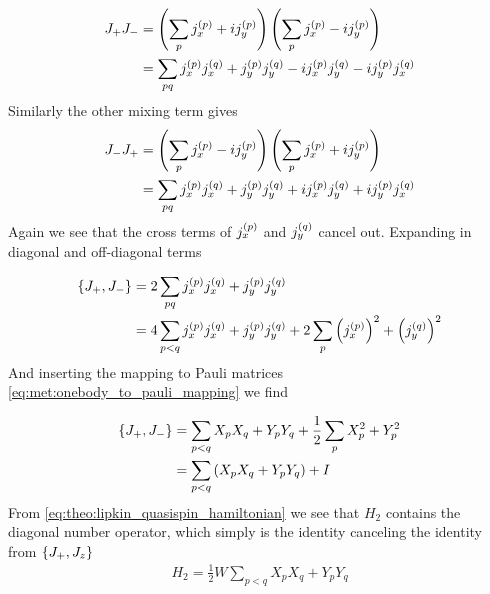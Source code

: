 \begin{align*}
    J_+ J_- &= \left(\sum_p j_{x}^{(p)} + ij_{y}^{(p)}\right) \left(\sum_p j_{x}^{(p)} - ij_{y}^{(p)}\right) \\
    &= \sum_{pq} j_{x}^{(p)}j_{x}^{(q)} + j_{y}^{(p)}j_{y}^{(q)} -i j_{x}^{(p)}j_{y}^{(q)} -i j_{y}^{(p)}j_{x}^{(q)}
\end{align*}
Similarly the other mixing term gives
\begin{align*}
    J_- J_+ &= \left(\sum_p j_{x}^{(p)} - ij_{y}^{(p)}\right) \left(\sum_p j_{x}^{(p)} + ij_{y}^{(p)}\right) \\
    &= \sum_{pq} j_{x}^{(p)}j_{x}^{(q)} + j_{y}^{(p)}j_{y}^{(q)} +i j_{x}^{(p)}j_{y}^{(q)} +i j_{y}^{(p)}j_{x}^{(q)}
\end{align*}
Again we see that the cross terms of $j_{x}^{(p)}$ and $j_{y}^{(q)}$ cancel out. Expanding in diagonal and off-diagonal terms

\begin{align*}
    \{J_+, J_-\} &= 2 \sum_{pq} j_{x}^{(p)}j_{x}^{(q)} + j_{y}^{(p)}j_{y}^{(q)} \\
    &= 4 \sum_{p < q} j_{x}^{(p)}j_{x}^{(q)} + j_{y}^{(p)}j_{y}^{(q)} + 2\sum_{p} \left(j_{x}^{(p)}\right)^2 + \left(j_{y}^{(q)}\right)^2
\end{align*}
And inserting the mapping to Pauli matrices \cref{eq:met:onebody_to_pauli_mapping} we find

\begin{align*}
    \{J_+, J_-\} &= \sum_{p < q} X_p X_q + Y_p Y_q + \frac{1}{2}\sum_{p}X_p^2 + Y_p^2 \\
     &= \sum_{p < q} \left(X_p X_q + Y_p Y_q\right) + I
\end{align*}
From \cref{eq:theo:lipkin_quasispin_hamiltonian} we see that $H_2$ contains the diagonal number operator, which simply is the identity canceling the identity from $\{J_+, J_z\}$
\begin{align}
    H_2 = \frac{1}{2}W \sum_{p < q} X_p X_q + Y_p Y_q 
\end{align}